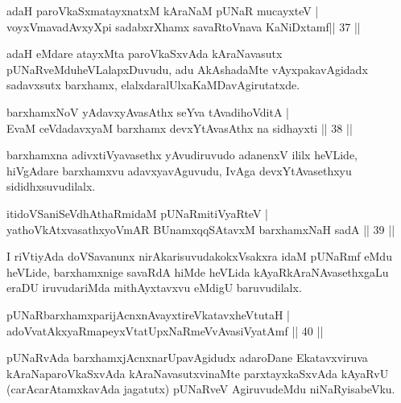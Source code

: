 
\begin{shl} 
adaH paroVkaSxmatayxnatxM kAraNaM pUNaR mucayxteV  | \\
voyxVmavadAvxyXpi sadabxrXhamx savaRtoV\s nava KaNiDxtamf\hfill|| 37 ||
\end{shl}

\begin{artha}
adaH eMdare atayxMta paroVkaSxvAda kAraNavasutx pUNaRveMdu\break heVLalapxDuvudu, adu AkAshadaMte vAyxpakavAgidadx sadavxsutx barxhamx, elalxdaralUlx\break aKaMDavAgirutatxde.
\end{artha}

\begin{shl}
barxhamxNoV yA\s davxyAvasAthx seYva tAvadihoVditA  | \\
EvaM ceVdadavxyaM barxhamx devxYtAvasAthx na sidhayxti \hfill||  38 ||  
\end{shl}

\begin{artha}
barxhamxna adivxtiVyavasethx yAvudiruvudo adanenxV ililx heVLide, hiVgAdare barxhamxvu adavxyavAguvudu, IvAga devxYtAvasethxyu sididhxsuvudilalx.
\end{artha}

\begin{shl}
itidoVSaniSeVdhAthaRmidaM pUNaRmitiVyaRteV  | \\
yathoVkAtxvasathxyoVmAR BUnamxqqSAtavxM barxhamxNaH sadA \hfill||  39 ||  
\end{shl}

\begin{artha}
I riVtiyAda doVSavanunx nirAkarisuvudakokxVsakxra idaM pUNaRmf eMdu heVLide, barxhamxnige savaRdA hiMde heVLida kAyaRkAraNAvasethxgaLu eraDU iruvudariMda mithAyxtavxvu eMdigU baruvudilalx.
\end{artha}

\begin{shl}
pUNaRbarxhamxparijAcnxnAvayxtireVkatavxheVtutaH  | \\
adoVvatAkxyaRmapeyxVtatUpxNaRmeVvAvasiVyatAmf \hfill||  40 ||  
\end{shl}

\begin{artha}
pUNaRvAda barxhamxjAcnxnarUpavAgidudx adaroDane Ekatavxviruva kAraNa\break paroVkaSxvAda kAraNavasutxvinaMte parxtayxkaSxvAda kAyaRvU (carAcarAtamxkavAda jagatutx) pUNaRveV AgiruvudeMdu niNaRyisabeVku.
\end{artha}

